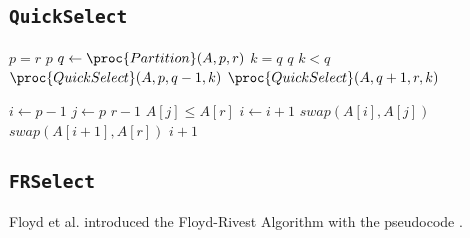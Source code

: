 \documentclass[acmconf,nonacm=true]{acmart}
\begin{document}
\begin{multicols}{2}
\subsection{\texttt{QuickSelect}}

\begin{codebox}
\li \If $p = r$
\li \Then \Return $p$
    \End
\li $q \gets \proc{Partition}(A, p, r)$
\li \If $k = q$
\li \Then \Return $q$
    \End
\li \ElseIf $k < q$
\li \Then \Return $\proc{QuickSelect}(A, p, q-1, k)$
\li \Else \Return $\proc{QuickSelect}(A, q+1, r, k)$
    \End
\end{codebox}


\begin{codebox}
\li $i \gets p - 1$
\li \For $j \gets p$ \To $r - 1$
\li \Do \If $A[j] \leq A[r]$
\li     \Then $i \gets i + 1$
\li         $swap(A[i], A[j])$
        \End
    \End
\li $swap(A[i+1], A[r])$
\li \Return $i + 1$
\End
\end{codebox}

\subsection{\texttt{FRSelect}}

Floyd et al. introduced the Floyd-Rivest Algorithm with the pseudocode \cite{floyd1975algorithm}.

\end{multicols}
\end{document}
